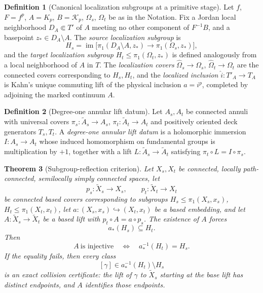 \documentclass[11pt,reqno]{amsart}
\newtheorem{theorem}{Theorem}[section]
\theoremstyle{definition}
\newtheorem{definition}[theorem]{Definition}
\theoremstyle{remark}
\begin{document}
\begin{definition}[Canonical localization subgroups at a primitive stage]
\label{def:canonical-localization-subgroups}
Let \(f\), \(F=f^p\), \(A=K_p\), \(B=\mathcal K_p\), \(\Omega_s\),
\(\Omega_t\) be as in the Notation.  Fix a Jordan local neighborhood
\(D_A\Subset T'\) of \(A\) meeting no other component of \(F^{-1}B\),
and a basepoint \(z_*\in D_A\setminus A\).  The \emph{source
localization subgroup} is
\[
 H_s=\operatorname{im}\bigl[\pi_1(D_A\setminus A,z_*)\longrightarrow
 \pi_1(\Omega_s,z_*)\bigr],
\]
and the \emph{target localization subgroup}
\(H_t\le\pi_1(\Omega_t,z_*)\) is defined analogously from a local
neighborhood of \(A\) in \(T\).  The \emph{localization covers}
\(\widehat\Omega_s\to\Omega_s\), \(\widehat\Omega_t\to\Omega_t\) are the
connected covers corresponding to \(H_s,H_t\), and the \emph{localized
inclusion} \(\widehat i:T'_A\to T_A\) is Kahn's unique commuting lift of
the physical inclusion \(a=i^p\), completed by adjoining the marked
continuum \(A\).
\end{definition}

\begin{definition}[Degree-one annular lift datum]
\label{def:annular-lift-data}
Let \(A_s,A_t\) be connected annuli with universal covers
\(\pi_s:\widetilde A_s\to A_s\), \(\pi_t:\widetilde A_t\to A_t\) and
positively oriented deck generators \(T_s,T_t\).  A \emph{degree-one
annular lift datum} is a holomorphic immersion \(I:A_s\to A_t\) whose
induced homomorphism on fundamental groups is multiplication by \(+1\),
together with a lift \(L:\widetilde A_s\to\widetilde A_t\) satisfying
\(\pi_t\circ L=I\circ\pi_s\).
\end{definition}
\begin{theorem}[Subgroup-reflection criterion]
\label{thm:subgroup-reflection-criterion}
Let \(X_s,X_t\) be connected, locally path-connected, semilocally simply
connected spaces, let
\[
 p_s:\widetilde X_s\to X_s,\qquad p_t:\widetilde X_t\to X_t
\]
be connected based covers corresponding to subgroups
\(H_s\le\pi_1(X_s,x_s)\), \(H_t\le\pi_1(X_t,x_t)\), let
\(a:(X_s,x_s)\hookrightarrow(X_t,x_t)\) be a based embedding, and let
\(A:\widetilde X_s\to\widetilde X_t\) be a based lift with
\(p_t\circ A=a\circ p_s\).  The existence of \(A\) forces
\[
 a_*(H_s)\subseteq H_t .
\]
Then
\[
 A\ \text{is injective}
 \quad\Longleftrightarrow\quad
 a_*^{-1}(H_t)=H_s .
\]
If the equality fails, then every class
\[
 [\gamma]\in a_*^{-1}(H_t)\setminus H_s
\]
is an exact collision certificate: the lift of \(\gamma\) to
\(\widetilde X_s\) starting at the base lift has distinct endpoints,
and \(A\) identifies those endpoints.
\end{theorem}
\end{document}
